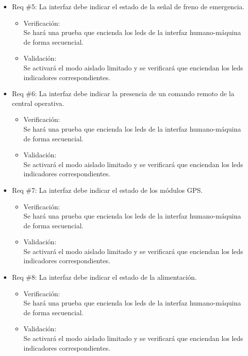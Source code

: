 \documentclass[11pt]{charter}
\begin{document}
\begin{itemize}
\item Req \#5: La interfaz debe indicar el estado de la señal de freno de emergencia.
\begin{itemize}
  \item Verificación:\\
  Se hará una prueba que encienda los leds de la interfaz humano-máquina de forma secuencial.
  \item Validación:\\
  Se activará el modo aislado limitado y se verificará que enciendan los leds indicadores correspondientes.
\end{itemize}

\item Req \#6: La interfaz debe indicar la presencia de un comando remoto de la central operativa.
\begin{itemize}
  \item Verificación:\\
  Se hará una prueba que encienda los leds de la interfaz humano-máquina de forma secuencial.
  \item Validación:\\
  Se activará el modo aislado limitado y se verificará que enciendan los leds indicadores correspondientes.
\end{itemize}

\item Req \#7: La interfaz debe indicar el estado de los módulos GPS.
\begin{itemize}
  \item Verificación:\\
  Se hará una prueba que encienda los leds de la interfaz humano-máquina de forma secuencial.
  \item Validación:\\
  Se activará el modo aislado limitado y se verificará que enciendan los leds indicadores correspondientes.
\end{itemize}

\item Req \#8: La interfaz debe indicar el estado de la alimentación.
\begin{itemize}
  \item Verificación:\\
  Se hará una prueba que encienda los leds de la interfaz humano-máquina de forma secuencial.
  \item Validación:\\
  Se activará el modo aislado limitado y se verificará que enciendan los leds indicadores correspondientes.
\end{itemize}


\end{itemize}
\end{document}
